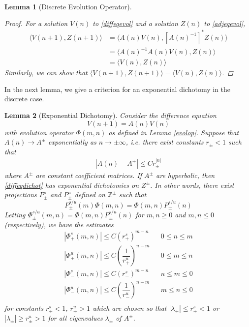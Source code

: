\documentclass[12pt]{article}
\def\Z{{\mathbb Z}}
\newtheorem{lemma}{Lemma}
\begin{document}
\begin{lemma}[Discrete Evolution Operator]
\begin{proof}
For a solution $V(n)$ to \eqref{diffeqevol} and a solution $Z(n)$ to \eqref{adjeqevol},
\begin{align*}
\langle V(n+1), Z(n+1) \rangle &= 
\langle A(n) V(n), [A(n)^{-1}]^* Z(n) \rangle \\
&= \langle A(n)^{-1} A(n) V(n), Z(n) \rangle \\
&= \langle V(n), Z(n) \rangle
\end{align*}
Similarly, we can show that $\langle V(n+1), Z(n+1) \rangle = \langle V(n), Z(n) \rangle$.
\end{proof}
\end{lemma}

In the next lemma, we give a criterion for an exponential dichotomy in the discrete case.

\begin{lemma}[Exponential Dichotomy]\label{dichotomy}
Consider the difference equation
\begin{equation}\label{diffeqdichot}
V(n+1) = A(n) V(n)
\end{equation}
with evolution operator $\Phi(m, n)$ as defined in Lemma \ref{evolop}. Suppose that $A(n) \rightarrow A^\pm$ exponentially as $n \rightarrow \pm \infty$, i.e. there exist constants $r_\pm < 1$ such that
\begin{align*}
|A(n) - A^\pm| \leq C r_\pm^{|n|}
\end{align*}
where $A^\pm$ are constant coefficient matrices. If $A^\pm$ are hyperbolic, then \eqref{diffeqdichot} has exponential dichotomies on $Z^\pm$. In other words, there exist projections $P_\pm^s$ and $P_\pm^u$ defined on $\Z^\pm$ such that
\begin{equation}\label{projcommute}
P_\pm^{s/u}(m) \Phi(m, n) =  \Phi(m, n) P_\pm^{s/u}(n)
\end{equation}
Letting $\Phi_\pm^{s/u}(m, n) = \Phi(m, n) P_\pm^{s/u}(n)$ for $m, n \geq 0$ and $m, n \leq 0$ (respectively), we have the estimates
\begin{align*}
|\Phi_+^s(m, n)| \leq C (r_+^s)^{m - n} && 0 \leq n \leq m \\
|\Phi_+^u(m, n)| \leq C \left( \dfrac{1}{r_+^u} \right)^{n-m} && 0 \leq m \leq n \\
|\Phi_-^s(m, n)| \leq C (r_-^s)^{m - n} && n \leq m \leq 0 \\
|\Phi_-^u(m, n)| \leq C \left( \dfrac{1}{r_-^u} \right)^{n-m} && m \leq n \leq 0\\
\end{align*}
for constants $r_\pm^s < 1$, $r_\pm^u > 1$ which are chosen so that $|\lambda_\pm| \leq r_\pm^s < 1$ or $|\lambda_\pm| \geq r_\pm^u > 1$ for all eigenvalues $\lambda_\pm$ of $A^\pm$. 
 

\end{lemma}
\end{document}

